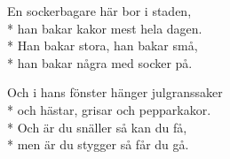 \begin{SongText}[En sockerbagare]
    \begin{SongVerse}
        En sockerbagare här bor i staden,\\*%
        han bakar kakor mest hela dagen.\\*%
        Han bakar stora, han bakar små,\\*%
        han bakar några med socker på.
    \end{SongVerse}
    \begin{SongVerse}
        Och i hans fönster hänger julgranssaker\\*%
        och hästar, grisar och pepparkakor.\\*%
        Och är du snäller så kan du få,\\*%
        men är du stygger så får du gå.
    \end{SongVerse}
    \begin{SongVerse}
    \end{SongVerse}
\end{SongText}
